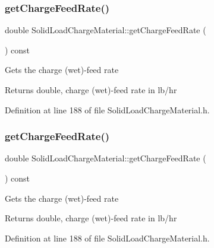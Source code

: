 \subsubsection{\texorpdfstring{get\+Charge\+Feed\+Rate()}{getChargeFeedRate()}\hspace{0.1cm}{\footnotesize\ttfamily [1/3]}}
{\footnotesize\ttfamily double Solid\+Load\+Charge\+Material\+::get\+Charge\+Feed\+Rate (\begin{DoxyParamCaption}{ }\end{DoxyParamCaption}) const\hspace{0.3cm}{\ttfamily [inline]}}

Gets the charge (wet)-\/feed rate \begin{DoxyReturn}{Returns}
double, charge (wet)-\/feed rate in lb/hr 
\end{DoxyReturn}


Definition at line 188 of file Solid\+Load\+Charge\+Material.\+h.

\mbox{\label{class_solid_load_charge_material_af6f018c5d67e94d86f2f57fecaa32b5c}} 
\subsubsection{\texorpdfstring{get\+Charge\+Feed\+Rate()}{getChargeFeedRate()}\hspace{0.1cm}{\footnotesize\ttfamily [2/3]}}
{\footnotesize\ttfamily double Solid\+Load\+Charge\+Material\+::get\+Charge\+Feed\+Rate (\begin{DoxyParamCaption}{ }\end{DoxyParamCaption}) const\hspace{0.3cm}{\ttfamily [inline]}}

Gets the charge (wet)-\/feed rate \begin{DoxyReturn}{Returns}
double, charge (wet)-\/feed rate in lb/hr 
\end{DoxyReturn}


Definition at line 188 of file Solid\+Load\+Charge\+Material.\+h.

\mbox{\label{class_solid_load_charge_material_af6f018c5d67e94d86f2f57fecaa32b5c}} 
